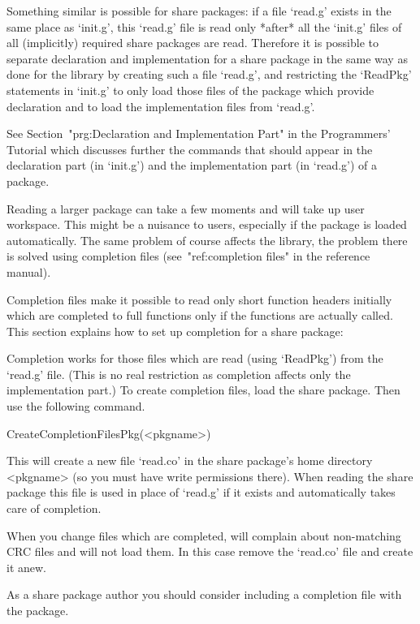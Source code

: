 Something similar  is possible for  share packages: if a file `read.g'
exists in the same place as `init.g',  this `read.g' file is read only
*after*  all  the `init.g' files   of  all (implicitly) required share
packages  are read.  Therefore  it is possible to separate declaration
and implementation for a share package in the same way as done for the
library  by  creating  such  a file   `read.g',   and restricting  the
`ReadPkg' statements  in  `init.g' to  only load   those  files of the
package which provide declaration and to load the implementation files
from `read.g'.

See Section~"prg:Declaration and Implementation Part" in the Programmers'
Tutorial which discusses further the commands that should appear in the
declaration part (in `init.g') and the implementation part (in `read.g')
of a package.


Reading a larger package can take a few moments and will take up user
workspace. This might be a nuisance to users, especially if the package is
loaded automatically.
The same problem of course affects the library, the problem there is solved
using completion files (see~"ref:completion files" in the reference manual).

Completion files make it possible to read only short function headers
initially which are completed to full functions only if the functions are
actually called.  This section explains how to set up completion for a share
package:

Completion works for those files which are read (using `ReadPkg')
from the `read.g' file. (This is no real restriction as completion affects
only the implementation part.) To create completion files, load the share
package. Then use the following command.

\>CreateCompletionFilesPkg(<pkgname>)

This will create a new file `read.co' in the share package's home directory
<pkgname> (so you must have write permissions there). When reading the share
package this file is used in place of `read.g' if it exists and automatically
takes care of completion.

When you change files which are completed, {\GAP} will complain about
non-matching CRC files and will not load them. In this case remove
the `read.co' file and create it anew.

As a share package author you should consider including a completion file
with the package.

